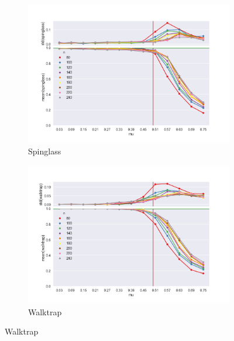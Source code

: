 \begin{figure}
    \begin{subfigure}[b]{0.32\textwidth}
        \includegraphics[width=\textwidth]{fig/nmi_vs_mu_spinglass}
        \caption{Spinglass}
        \label{fig:gull}
    \end{subfigure}
    \qquad
    \begin{subfigure}[b]{0.32\textwidth}
        \includegraphics[width=\textwidth]{fig/nmi_vs_mu_walktrap}
        \caption{Walktrap}
        \label{fig:tiger}
    \end{subfigure}
    

\end{figure}
